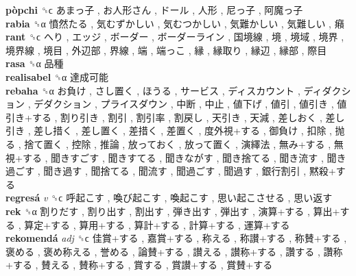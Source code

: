 \textbf{pòpchi} ␝ϲ   あまっ子 ,  お人形さん ,  ドール ,  人形 ,  尼っ子 ,  阿魔っ子   \\
\textbf{rabia} ␝α   憤然たる ,  気むずかしい ,  気むつかしい ,  気難かしい ,  気難しい ,  癪   \\
\textbf{rant} ␝ϲ   へり ,  エッジ ,  ボーダー ,  ボーダーライン ,  国境線 ,  境 ,  境域 ,  境界 ,  境界線 ,  境目 ,  外辺部 ,  界線 ,  端 ,  端っこ ,  縁 ,  縁取り ,  縁辺 ,  縁部 ,  際目   \\
\textbf{rasa} ␝α   品種   \\
\textbf{realisabel} ␝α   達成可能   \\
\textbf{rebaha} ␝α   お負け ,  さし置く ,  ほうる ,  サービス ,  ディスカウント ,  ディダクション ,  デダクション ,  プライスダウン ,  中断 ,  中止 ,  値下げ ,  値引 ,  値引き ,  値引き+する ,  割り引き ,  割引 ,  割引率 ,  割戻し ,  天引き ,  天減 ,  差しおく ,  差し引き ,  差し措く ,  差し置く ,  差措く ,  差置く ,  度外視+する ,  御負け ,  扣除 ,  抛る ,  捨て置く ,  控除 ,  推論 ,  放っておく ,  放って置く ,  演繹法 ,  無み+する ,  無視+する ,  聞きすごす ,  聞きすてる ,  聞きながす ,  聞き捨てる ,  聞き流す ,  聞き過ごす ,  聞き過す ,  聞捨てる ,  聞流す ,  聞過ごす ,  聞過す ,  銀行割引 ,  黙殺+する   \\
\textbf{regresá} \emph{v}  ␝ϲ   呼起こす ,  喚び起こす ,  喚起こす ,  思い起こさせる ,  思い返す   \\
\textbf{rek} ␝α   割りだす ,  割り出す ,  割出す ,  弾き出す ,  弾出す ,  演算+する ,  算出+する ,  算定+する ,  算用+する ,  算計+する ,  計算+する ,  運算+する   \\
\textbf{rekomendá} \emph{adj}  ␝ϲ   佳賞+する ,  嘉賞+する ,  称える ,  称讃+する ,  称賛+する ,  褒める ,  褒め称える ,  誉める ,  論賛+する ,  讃える ,  讃称+する ,  讚する ,  讚称+する ,  賛える ,  賛称+する ,  賞する ,  賞讃+する ,  賞賛+する   \\
